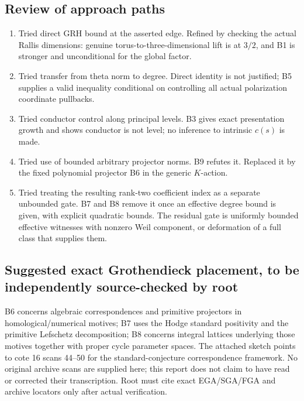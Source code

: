 \subsection{Review of approach paths}\label{review-of-approach-paths}

\begin{enumerate}
\def\labelenumi{\arabic{enumi}.}
\tightlist
\item
  Tried direct GRH bound at the asserted edge. Refined by checking the actual Rallis dimensions: genuine torus-to-three-dimensional lift is at \(3/2\), and B1 is stronger and unconditional for the global factor.
\item
  Tried transfer from theta norm to degree. Direct identity is not justified; B5 supplies a valid inequality conditional on controlling all actual polarization coordinate pullbacks.
\item
  Tried conductor control along principal levels. B3 gives exact presentation growth and shows conductor is not level; no inference to intrinsic \(c(s)\) is made.
\item
  Tried use of bounded arbitrary projector norms. B9 refutes it. Replaced it by the fixed polynomial projector B6 in the generic \(K\)-action.
\item
  Tried treating the resulting rank-two coefficient index as a separate unbounded gate. B7 and B8 remove it once an effective degree bound is given, with explicit quadratic bounds. The residual gate is uniformly bounded effective witnesses with nonzero Weil component, or deformation of a full class that supplies them.
\end{enumerate}

\subsection{Suggested exact Grothendieck placement, to be independently source-checked by root}\label{suggested-exact-grothendieck-placement-to-be-independently-source-checked-by-root}

B6 concerns algebraic correspondences and primitive projectors in homological/numerical motives; B7 uses the Hodge standard positivity and the primitive Lefschetz decomposition; B8 concerns integral lattices underlying those motives together with proper cycle parameter spaces. The attached sketch points to cote 16 scans 44--50 for the standard-conjecture correspondence framework. No original archive scans are supplied here; this report does not claim to have read or corrected their transcription. Root must cite exact EGA/SGA/FGA and archive locators only after actual verification.

